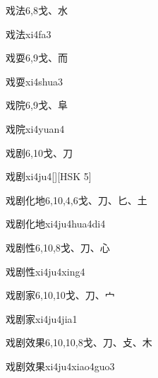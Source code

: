 \begin{entry}{戏法}{6,8}{⼽、⽔}
  \begin{phonetics}{戏法}{xi4fa3}
  \end{phonetics}
\end{entry}

\begin{entry}{戏耍}{6,9}{⼽、⽽}
  \begin{phonetics}{戏耍}{xi4shua3}
  \end{phonetics}
\end{entry}

\begin{entry}{戏院}{6,9}{⼽、⾩}
  \begin{phonetics}{戏院}{xi4yuan4}
  \end{phonetics}
\end{entry}

\begin{entry}{戏剧}{6,10}{⼽、⼑}
  \begin{phonetics}{戏剧}{xi4ju4}[][HSK 5]
  \end{phonetics}
\end{entry}

\begin{entry}{戏剧化地}{6,10,4,6}{⼽、⼑、⼔、⼟}
  \begin{phonetics}{戏剧化地}{xi4ju4hua4di4}
  \end{phonetics}
\end{entry}

\begin{entry}{戏剧性}{6,10,8}{⼽、⼑、⼼}
  \begin{phonetics}{戏剧性}{xi4ju4xing4}
  \end{phonetics}
\end{entry}

\begin{entry}{戏剧家}{6,10,10}{⼽、⼑、⼧}
  \begin{phonetics}{戏剧家}{xi4ju4jia1}
  \end{phonetics}
\end{entry}

\begin{entry}{戏剧效果}{6,10,10,8}{⼽、⼑、⽁、⽊}
  \begin{phonetics}{戏剧效果}{xi4ju4xiao4guo3}
  \end{phonetics}
\end{entry}

